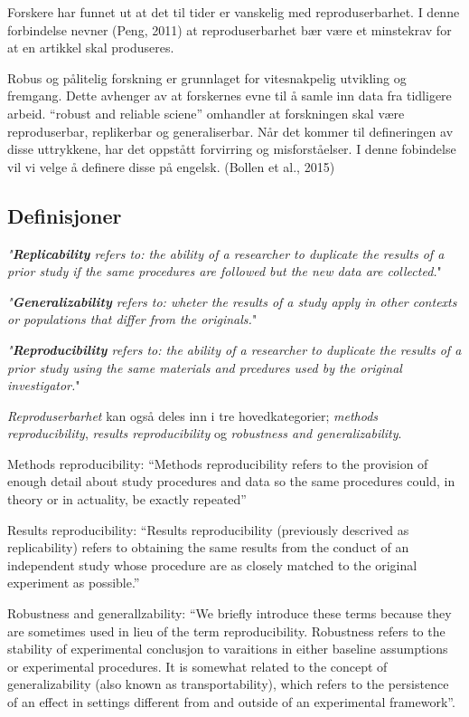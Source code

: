 \documentclass[
  12pt,
]{article}
\begin{document}
Forskere har funnet ut at det til tider er vanskelig med
reproduserbarhet. I denne forbindelse nevner (Peng, 2011) at
reproduserbarhet bær være et minstekrav for at en artikkel skal
produseres.

Robus og pålitelig forskning er grunnlaget for vitesnakpelig utvikling
og fremgang. Dette avhenger av at forskernes evne til å samle inn data
fra tidligere arbeid. ``robust and reliable sciene'' omhandler at
forskningen skal være reproduserbar, replikerbar og generaliserbar. Når
det kommer til defineringen av disse uttrykkene, har det oppstått
forvirring og misforståelser. I denne fobindelse vil vi velge å definere
disse på engelsk. (Bollen et al., 2015)

\hypertarget{definisjoner}{%
\subsection{Definisjoner}\label{definisjoner}}

\emph{"\textbf{Replicability} refers to: the ability of a researcher to
duplicate the results of a prior study if the same procedures are
followed but the new data are collected.}"

\emph{"\textbf{Generalizability} refers to: wheter the results of a
study apply in other contexts or populations that differ from the
originals.}"

\emph{"\textbf{Reproducibility} refers to: the ability of a researcher
to duplicate the results of a prior study using the same materials and
prcedures used by the original investigator.}"

\emph{\emph{Reproduserbarhet}} kan også deles inn i tre hovedkategorier;
\emph{methods reproducibility}, \emph{results reproducibility} og
\emph{robustness and generalizability}.

Methods reproducibility: ``Methods reproducibility refers to the
provision of enough detail about study procedures and data so the same
procedures could, in theory or in actuality, be exactly repeated''

Results reproducibility: ``Results reproducibility (previously descrived
as replicability) refers to obtaining the same results from the conduct
of an independent study whose procedure are as closely matched to the
original experiment as possible.''

Robustness and generallzability: ``We briefly introduce these terms
because they are sometimes used in lieu of the term reproducibility.
Robustness refers to the stability of experimental conclusjon to
varaitions in either baseline assumptions or experimental procedures. It
is somewhat related to the concept of generalizability (also known as
transportability), which refers to the persistence of an effect in
settings different from and outside of an experimental framework''.
\end{document}
